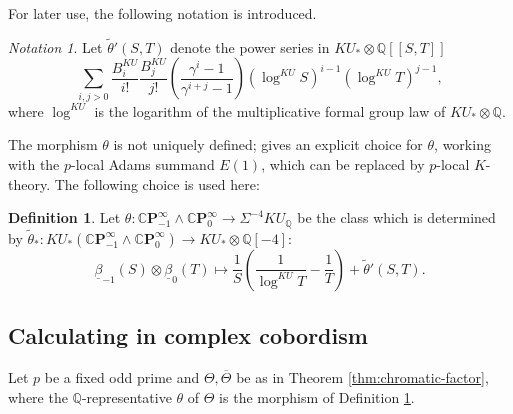 \documentclass[10pt,a4paper]{amsart}
\theoremstyle{definition}
\newtheorem{defn}[thm]{Definition}
\theoremstyle{remark}
\newtheorem{nota}[thm]{Notation}
\newcommand{\rat}{\mathbb{Q}}
\newcommand{\cp}{\mathbb{C} \mathbf{P}^\infty}
\renewcommand{\smash}{\wedge}
\begin{document}
For later use, the following notation is introduced.

\begin{nota}
\label{nota:tilde_theta_prime}
	Let $\tilde{\theta} ' (S,T)  $ denote the power series in $KU_* \otimes \rat [[S,T]]$
	\[
 \sum _{i, j >0}\frac{B_i^{KU}}{i!}\frac{B_j^{KU}}{j!}
\left(
\frac{\gamma^i -1}{\gamma^{i+j}-1}
\right)
(\log^{KU} S)^{i-1}(\log ^{KU} T) ^{j-1},
\]
where $\log^{KU}$ is the logarithm of the multiplicative formal group law of $KU_* \otimes \rat$.
\end{nota}


The morphism $\theta$ is not uniquely defined; \cite[Theorem 5.2]{BCGHRW} gives an explicit choice for $\theta$, working
with the $p$-local Adams summand $E(1)$, which can be replaced by $p$-local $K$-theory. The following choice is used here:


\begin{defn}
\label{def:theta}
Let $\theta : \cp_{-1} \smash \cp_0 \rightarrow \Sigma ^{-4} KU_\rat$ be the class
 which is determined by
$\tilde{\theta}_* : KU_*(\cp_{-1}\smash \cp_0) \rightarrow KU_* \otimes \rat [-4]$:
\[
	\underline{\beta}_{-1}(S) \otimes \underline{ \beta}_0(T)
	\mapsto
	\frac{1}{S} \left(\frac{1}{\log^{KU}T} - \frac{1}{T}\right)
+
\tilde{\theta}' (S,T).
\]
\end{defn}




\subsection{Calculating in complex cobordism}


Let $p$ be a fixed odd prime and $\Theta, \overline{\Theta}$ be as in  Theorem
\ref{thm:chromatic-factor}, where  the $\rat$-representative $\theta$ of $\Theta$ is the morphism of Definition
\ref{def:theta}.
\end{document}
